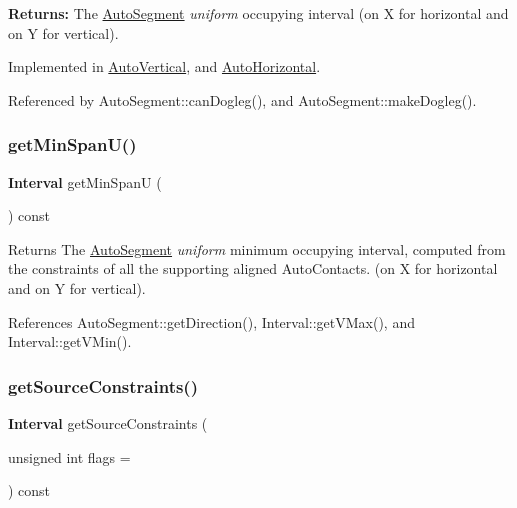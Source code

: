 {\bfseries Returns\+:} The \mbox{\hyperlink{classKatabatic_1_1AutoSegment}{Auto\+Segment}} {\itshape uniform} occupying interval (on X for horizontal and on Y for vertical). 

Implemented in \mbox{\hyperlink{classKatabatic_1_1AutoVertical_a0b5ac47ab175815e1a9bc07f2517614a}{Auto\+Vertical}}, and \mbox{\hyperlink{classKatabatic_1_1AutoHorizontal_a0b5ac47ab175815e1a9bc07f2517614a}{Auto\+Horizontal}}.



Referenced by Auto\+Segment\+::can\+Dogleg(), and Auto\+Segment\+::make\+Dogleg().

\mbox{\label{classKatabatic_1_1AutoSegment_acc329583aa1546ed5a01e0628f3ca6ad}} 
\subsubsection{\texorpdfstring{get\+Min\+Span\+U()}{getMinSpanU()}}
{\footnotesize\ttfamily \textbf{ Interval} get\+Min\+SpanU (\begin{DoxyParamCaption}{ }\end{DoxyParamCaption}) const}

\begin{DoxyReturn}{Returns}
The \mbox{\hyperlink{classKatabatic_1_1AutoSegment}{Auto\+Segment}} {\itshape uniform} minimum occupying interval, computed from the constraints of all the supporting aligned Auto\+Contacts. (on X for horizontal and on Y for vertical). 
\end{DoxyReturn}


References Auto\+Segment\+::get\+Direction(), Interval\+::get\+V\+Max(), and Interval\+::get\+V\+Min().

\mbox{\label{classKatabatic_1_1AutoSegment_ab7685e309e1d910db3e8237f8a898c35}} 
\subsubsection{\texorpdfstring{get\+Source\+Constraints()}{getSourceConstraints()}}
{\footnotesize\ttfamily \textbf{ Interval} get\+Source\+Constraints (\begin{DoxyParamCaption}\item[{unsigned int}]{flags = {} }\end{DoxyParamCaption}) const\hspace{0.3cm}{\ttfamily [pure virtual]}}


